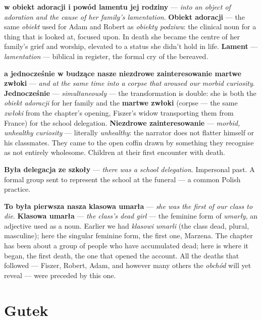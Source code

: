 \textbf{w obiekt adoracji i powód lamentu jej rodziny} ---
\textit{into an object of adoration and the cause of her
family's lamentation}. \textbf{Obiekt adoracji} --- the same
\textit{obiekt} used for Adam and Robert as \textit{obiekty
podziwu}: the clinical noun for a thing that is looked at,
focused upon. In death she became the centre of her family's
grief and worship, elevated to a status she didn't hold in life.
\textbf{Lament} --- \textit{lamentation} --- biblical in
register, the formal cry of the bereaved.

\textbf{a jednocześnie w budzące nasze niezdrowe zainteresowanie
martwe zwłoki} --- \textit{and at the same time into a corpse
that aroused our morbid curiosity}. \textbf{Jednocześnie} ---
\textit{simultaneously} --- the transformation is double: she is
both the \textit{obiekt adoracji} for her family and the
\textbf{martwe zwłoki} (corpse --- the same \textit{zwłoki} from
the chapter's opening, Fiszer's widow transporting them from
France) for the school delegation. \textbf{Niezdrowe
zainteresowanie} --- \textit{morbid, unhealthy curiosity} ---
literally \textit{unhealthy}: the narrator does not flatter
himself or his classmates. They came to the open coffin drawn by
something they recognise as not entirely wholesome. Children at
their first encounter with death.

\textbf{Była delegacja ze szkoły} --- \textit{there was a school
delegation}. Impersonal past. A formal group sent to represent
the school at the funeral --- a common Polish practice.

\textbf{To była pierwsza nasza klasowa umarła} --- \textit{she
was the first of our class to die}. \textbf{Klasowa umarła} ---
\textit{the class's dead girl} --- the feminine form of
\textit{umarły}, an adjective used as a noun. Earlier we had
\textit{klasowi umarli} (the class dead, plural, masculine); here
the singular feminine form, the first one, Marzena. The chapter
has been about a group of people who have accumulated dead; here
is where it began, the first death, the one that opened the
account. All the deaths that followed --- Fiszer, Robert, Adam,
and however many others the \textit{obchód} will yet reveal ---
were preceded by this one.

\section{Gutek}

